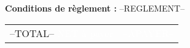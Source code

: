 \documentclass[a4paper, oneside, 10pt, french]{article}
\newcommand{\ghline}{\arrayrulecolor{gray}\hline\arrayrulecolor{black}}
\begin{document}
\begin{minipage}[t]{0.48\textwidth}
{\footnotesize \textbf{Conditions de règlement :} --REGLEMENT--}\\
\end{minipage}
\hspace{2mm}
\begin{minipage}[t]{0.50\textwidth}
\begin{flushright}
\begin{tabular}{p{4.5cm} r}
--TOTAL--
\rowcolor{violet}\textcolor{white}{NET à payer} &\textcolor{white}{--APAYER--} \\ 
\end{tabular} 
\end{flushright}
\end{minipage}
\end{document}
